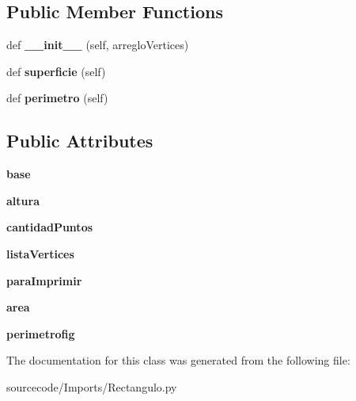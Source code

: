 \subsection*{Public Member Functions}
\begin{DoxyCompactItemize}
\item 
\mbox{\label{class_imports_1_1_rectangulo_1_1_rectangulo_aa6ab5baaedcd4a9c6fb090814cde383b}} 
def {\bfseries \+\_\+\+\_\+init\+\_\+\+\_\+} (self, arreglo\+Vertices)
\item 
\mbox{\label{class_imports_1_1_rectangulo_1_1_rectangulo_a5b7f4096dc85ee69031961b350c18246}} 
def {\bfseries superficie} (self)
\item 
\mbox{\label{class_imports_1_1_rectangulo_1_1_rectangulo_a0ae19a4ba2f6832f66a0fdd898e3157c}} 
def {\bfseries perimetro} (self)
\end{DoxyCompactItemize}
\subsection*{Public Attributes}
\begin{DoxyCompactItemize}
\item 
\mbox{\label{class_imports_1_1_rectangulo_1_1_rectangulo_a36ca6e796e1f7b657c571e98547537e3}} 
{\bfseries base}
\item 
\mbox{\label{class_imports_1_1_rectangulo_1_1_rectangulo_a15404135d90de586e52e83075d74c1e8}} 
{\bfseries altura}
\item 
\mbox{\label{class_imports_1_1_rectangulo_1_1_rectangulo_abebc186ecfd1eba7524ff4e785f24ac5}} 
{\bfseries cantidad\+Puntos}
\item 
\mbox{\label{class_imports_1_1_rectangulo_1_1_rectangulo_abfc7b38112507df38e844f7193280ffe}} 
{\bfseries lista\+Vertices}
\item 
\mbox{\label{class_imports_1_1_rectangulo_1_1_rectangulo_aed720603f3b0477a0e5f65f8640dfea1}} 
{\bfseries para\+Imprimir}
\item 
\mbox{\label{class_imports_1_1_rectangulo_1_1_rectangulo_abecb88c5bdf7b9a3ae65051c532f4c1f}} 
{\bfseries area}
\item 
\mbox{\label{class_imports_1_1_rectangulo_1_1_rectangulo_a551ae87f2231e75d52de16e0239bcde0}} 
{\bfseries perimetrofig}
\end{DoxyCompactItemize}


The documentation for this class was generated from the following file\+:\begin{DoxyCompactItemize}
\item 
sourcecode/\+Imports/Rectangulo.\+py\end{DoxyCompactItemize}
